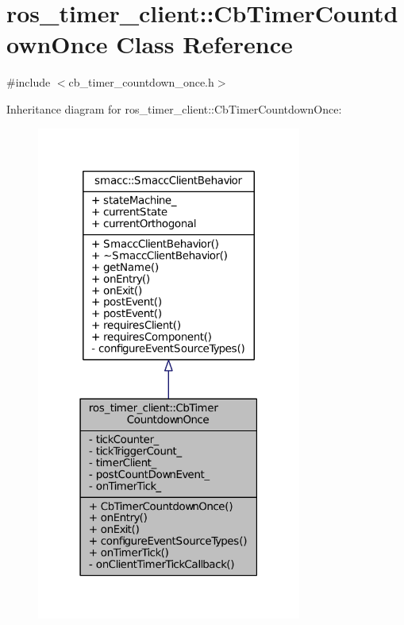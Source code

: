\hypertarget{classros__timer__client_1_1CbTimerCountdownOnce}{}\section{ros\+\_\+timer\+\_\+client\+:\+:Cb\+Timer\+Countdown\+Once Class Reference}
\label{classros__timer__client_1_1CbTimerCountdownOnce}


{\ttfamily \#include $<$cb\+\_\+timer\+\_\+countdown\+\_\+once.\+h$>$}



Inheritance diagram for ros\+\_\+timer\+\_\+client\+:\+:Cb\+Timer\+Countdown\+Once\+:
\nopagebreak
\begin{figure}[H]
\begin{center}
\leavevmode
\includegraphics[width=247pt]{classros__timer__client_1_1CbTimerCountdownOnce__inherit__graph}
\end{center}
\end{figure}


